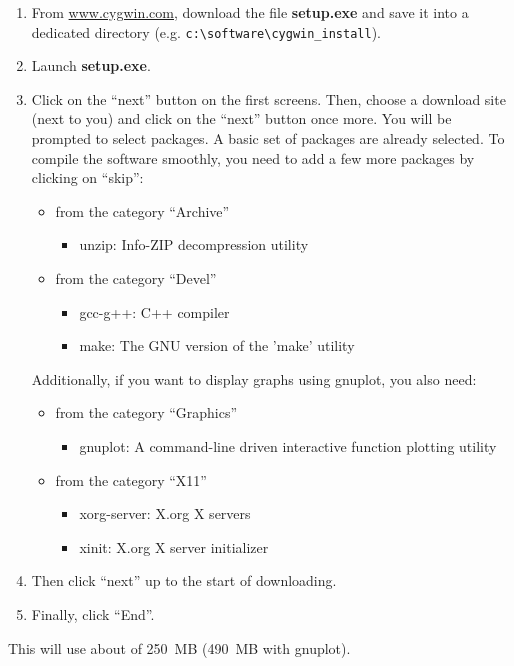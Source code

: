 \documentclass[a4paper, 11pt]{article}
\begin{document}
\begin{enumerate}
\item From \url{www.cygwin.com}, download the file \textbf{setup.exe} and save it into a dedicated directory (e.g. \verb!c:\software\cygwin_install!).
\item Launch \textbf{setup.exe}.
\item Click on the ``next'' button on the first screens. Then, choose a download site (next to you) and click on the ``next'' button once more. You will be prompted to select packages. A basic set of packages are already selected. To compile the software smoothly, you need to add a few more packages by clicking on ``skip'':
	\begin{itemize}
	\item from the category ``Archive''
		\begin{itemize}
		\item unzip: Info-ZIP decompression utility
		\end{itemize}
	\item from the category ``Devel''
		\begin{itemize}
		\item gcc-g++: C++ compiler 
		\item make: The GNU version of the 'make' utility
		\end{itemize}
	\end{itemize}
Additionally, if you want to display graphs using gnuplot, you also need:
	\begin{itemize}
	\item from the category ``Graphics''
		\begin{itemize}
		\item gnuplot: A command-line driven interactive function plotting utility
		\end{itemize}
	\item from the category ``X11''
		\begin{itemize}
		\item xorg-server: X.org X servers
		\item xinit: X.org X server initializer
		\end{itemize}
	\end{itemize}
\item Then click ``next'' up to the start of downloading.
\item Finally, click ``End''.
\end{enumerate}

This will use about of  250~MB (490~MB with gnuplot).
\end{document}
